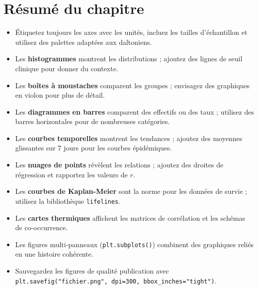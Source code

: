 \section{R\'esum\'e du chapitre}

\begin{itemize}
  \item \'Etiquetez toujours les axes avec les unit\'es, incluez les tailles d'\'echantillon et utilisez des palettes adapt\'ees aux daltoniens.
  \item Les \textbf{histogrammes} montrent les distributions ; ajoutez des lignes de seuil clinique pour donner du contexte.
  \item Les \textbf{bo\^ites \`a moustaches} comparent les groupes ; envisagez des graphiques en violon pour plus de d\'etail.
  \item Les \textbf{diagrammes en barres} comparent des effectifs ou des taux ; utilisez des barres horizontales pour de nombreuses cat\'egories.
  \item Les \textbf{courbes temporelles} montrent les tendances ; ajoutez des moyennes glissantes sur 7 jours pour les courbes \'epid\'emiques.
  \item Les \textbf{nuages de points} r\'ev\`elent les relations ; ajoutez des droites de r\'egression et rapportez les valeurs de $r$.
  \item Les \textbf{courbes de Kaplan-Meier} sont la norme pour les donn\'ees de survie ; utilisez la biblioth\`eque \texttt{lifelines}.
  \item Les \textbf{cartes thermiques} affichent les matrices de corr\'elation et les sch\'emas de co-occurrence.
  \item Les figures multi-panneaux (\texttt{plt.subplots()}) combinent des graphiques reli\'es en une histoire coh\'erente.
  \item Sauvegardez les figures de qualit\'e publication avec \texttt{plt.savefig("fichier.png", dpi=300, bbox\_inches="tight")}.
\end{itemize}
